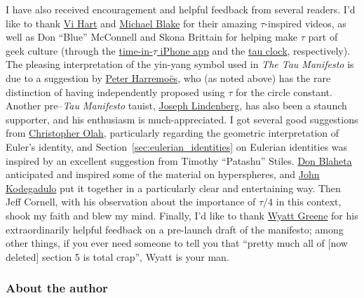 I have also received encouragement and helpful feedback from several readers. I'd like to thank \href{http://www.youtube.com/watch?v=jG7vhMMXagQ}{Vi Hart} and \href{http://www.youtube.com/watch?v=3174T-3-59Q}{Michael Blake} for their amazing $\tau$-inspired videos, as well as Don ``Blue'' McConnell and Skona Brittain for helping make $\tau$ part of geek culture (through the \href{http://tauclock.com/}{time-in-$\tau$ iPhone app} and the \href{http://www.sbcrafts.net/clocks/}{tau clock}, respectively). The pleasing interpretation of the yin-yang symbol used in \emph{The Tau Manifesto} is due to a suggestion by \href{http://www.harremoes.dk/Peter/}{Peter Harremo\"{e}s}, who (as noted above) has the rare distinction of having independently proposed using $\tau$ for the circle constant. Another pre--\emph{Tau Manifesto} tauist, \href{https://sites.google.com/site/taubeforeitwascool/}{Joseph Lindenberg}, has also been a staunch supporter, and his enthusiasm is much-appreciated. I got several good suggestions from \href{http://christopherolah.wordpress.com/about-me}{Christopher Olah}, particularly regarding the geometric interpretation of Euler's identity, and Section~\ref{sec:eulerian_identities} on Eulerian identities was inspired by an excellent suggestion from Timothy ``Patashu'' Stiles. \href{http://www.blahedo.org/blog/archives/001083.html}{Don Blaheta} anticipated and inspired some of the material on hyperspheres, and \href{http://spikedmath.com/forum/viewtopic.php?f=30&t=147\#p1577}{John Kodegadulo} put it together in a particularly clear and entertaining way. Then Jeff Cornell, with his observation about the importance of $\tau/4$ in this context, shook my faith and blew my mind.
Finally, I'd like to thank \href{http://techiferous.com/about}{Wyatt Greene} for his extraordinarily helpful feedback on a pre-launch draft of the manifesto; among other things, if you ever need someone to tell you that ``pretty much all of [now deleted] section 5 is total crap'', Wyatt is your man.



    \subsubsection{About the author} %
    \label{sec:about_the_author}

